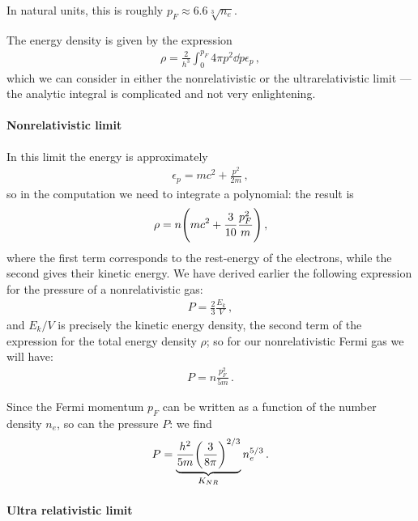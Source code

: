 \documentclass[main.tex]{subfiles}
\begin{document}
In natural units, this is roughly \(p_F \approx \num{6.6} \sqrt[3]{n_e}\).

The energy density is given by the expression
%
\begin{align}
  \rho = \frac{2}{h^3} \int_{0}^{p_F} 4 \pi p^2\dd{p} \epsilon _p
\,,
\end{align}
%
which we can consider in either the nonrelativistic or the ultrarelativistic limit --- the analytic integral is complicated and not very enlightening. 

\paragraph{Nonrelativistic limit}

In this limit the energy is approximately
%
\begin{align}
  \epsilon _p = mc^2 + \frac{p^2}{2m}
\,,
\end{align}
%
so in the computation we need to integrate a polynomial: the result is
%
\begin{align}
  \rho = n \qty(mc^2 + \frac{3}{10} \frac{p_F^2}{m})
\,,
\end{align}
%
where the first term corresponds to the rest-energy of the electrons, while the second gives their kinetic energy.
We have derived earlier the following expression for the pressure of a nonrelativistic gas:
%
\begin{align}
  P  = \frac{2}{3} \frac{E_k}{V}
\,,
\end{align}
%
and \(E_k / V\) is precisely the kinetic energy density, the second term of the expression for the total energy density \(\rho \); 
so for our nonrelativistic Fermi gas we will have:
%
\begin{align}
  P = n \frac{p_F^2}{5m} 
\,.
\end{align}

Since the Fermi momentum \(p_F\) can be written as a function of the number density \(n_e\), so can the pressure \(P\): we find 
%
\begin{align}
P = \underbrace{\frac{h^2}{5m} \qty(\frac{3}{8 \pi })^{2/3}}_{K_{NR}} n_e^{5/3}
\,.
\end{align}

\paragraph{Ultra relativistic limit}
\end{document}
